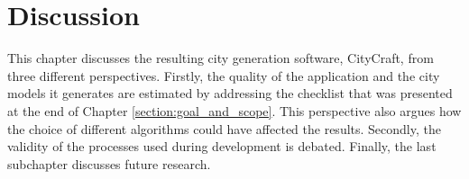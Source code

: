 \chapter{Discussion}

This chapter discusses the resulting city generation software, CityCraft, from three different perspectives.
Firstly, the quality of the application and the city models it generates are estimated by addressing the checklist that was presented at the end of Chapter \ref{section:goal_and_scope}.
This perspective also argues how the choice of different algorithms could have affected the results.
Secondly, the validity of the processes used during development is debated.
Finally, the last subchapter discusses future research.




